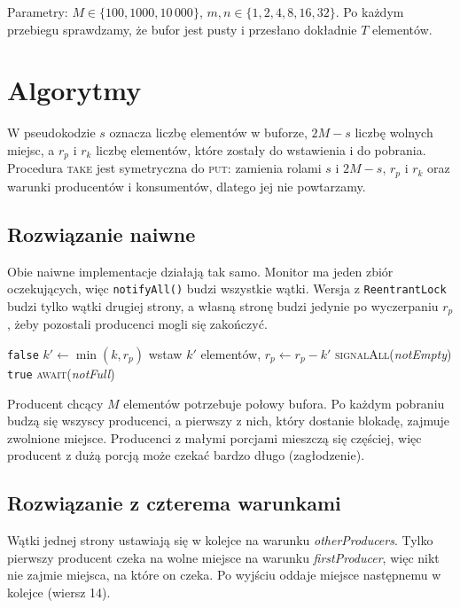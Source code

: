 \documentclass[11pt,a4paper]{article}
\newenvironment{algorytm}[1][htb]
  {\par\bigskip\floatname{algorithm}{}\renewcommand{\thealgorithm}{}
   \begin{algorithm}[#1]%
  }{\end{algorithm}\par\bigskip}
\begin{document}
Parametry: $M \in \{100, 1000, 10\,000\}$, $m, n \in \{1, 2, 4, 8, 16, 32\}$.
Po każdym przebiegu sprawdzamy, że bufor jest pusty i przesłano dokładnie $T$ elementów.

\section{Algorytmy}
W pseudokodzie $s$ oznacza liczbę elementów w buforze, $2M - s$ liczbę wolnych miejsc,
a $r_p$ i $r_k$ liczbę elementów, które zostały do wstawienia i do pobrania.
Procedura \textsc{take} jest symetryczna do \textsc{put}: zamienia rolami $s$ i $2M - s$,
$r_p$ i $r_k$ oraz warunki producentów i konsumentów, dlatego jej nie powtarzamy.

\subsection{Rozwiązanie naiwne}
\label{sec:naive}
Obie naiwne implementacje działają tak samo. Monitor ma jeden zbiór oczekujących,
więc \texttt{notifyAll()} budzi wszystkie wątki. Wersja z \texttt{ReentrantLock}
budzi tylko wątki drugiej strony, a własną stronę budzi jedynie po wyczerpaniu $r_p$,
żeby pozostali producenci mogli się zakończyć.

\begin{algorytm}[H]
\begin{algorithmic}[1]
        \Loop
                \State \Return \texttt{false}
            \EndIf
            \State $k' \gets \min(k, r_p)$
                \State wstaw $k'$ elementów, $r_p \gets r_p - k'$
                \State \textsc{signalAll}(\textit{notEmpty}) 
                \State \Return \texttt{true}
            \EndIf
            \State \textsc{await}(\textit{notFull}) 
        \EndLoop
    \EndProcedure
\end{algorithmic}
\caption{Wstawianie w rozwiązaniu naiwnym}
\end{algorytm}

Producent chcący $M$ elementów potrzebuje połowy bufora. Po każdym pobraniu budzą się
wszyscy producenci, a pierwszy z nich, który dostanie blokadę, zajmuje zwolnione miejsce.
Producenci z małymi porcjami mieszczą się częściej, więc producent z dużą porcją
może czekać bardzo długo (zagłodzenie).

\subsection{Rozwiązanie z czterema warunkami}
Wątki jednej strony ustawiają się w kolejce na warunku \textit{otherProducers}.
Tylko pierwszy producent czeka na wolne miejsce na warunku \textit{firstProducer},
więc nikt nie zajmie miejsca, na które on czeka. Po wyjściu oddaje miejsce
następnemu w kolejce (wiersz 14).
\end{document}
